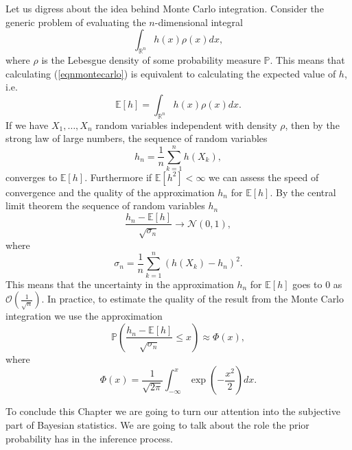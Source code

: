 \documentclass[12pt]{book}
\newcommand{\p}{\mathbb{P}}
\begin{document}
Let us digress about the idea behind Monte Carlo integration. Consider the generic problem of evaluating the $n$-dimensional
integral
\begin{equation}\label{eqnmontecarlo}
\int_{\mathbb{R}^{n}}h(x)\rho(x)dx,
\end{equation}  
where $\rho$ is the Lebesgue density of some probability measure $\p$. This means that calculating (\ref{eqnmontecarlo}) 
is equivalent to calculating the expected value of $h$, i.e.
\begin{equation*}
\mathbb{E}[h]=\int_{\mathbb{R}^{n}}h(x)\rho(x)dx.
\end{equation*}
If we have $X_{1},\ldots,X_{n}$ random variables independent with density $\rho$, then by the strong law of large numbers, the sequence of random
variables
\begin{equation*}
h_{n}=\frac{1}{n}\sum_{k=1}^{n} h(X_{k}),
\end{equation*}
converges to $\mathbb{E}[h]$\cite{dudley2002real}. Furthermore if $\mathbb{E}[h^{2}]<\infty$ we can assess the speed of
convergence and the quality of the approximation $h_{n}$ for $\mathbb{E}[h]$. By the central limit theorem
the sequence of random  variables $h_{n}$
\begin{equation*}
\frac{h_{n}-\mathbb{E}[h]}{\sqrt{\sigma_{n}}}\rightarrow \mathcal{N}(0,1),
\end{equation*}
where 
\begin{equation*}
\sigma_{n}=\frac{1}{n}\sum_{k=1}^{n}(h(X_{k})-h_{n})^{2}.
\end{equation*}
This means that the uncertainty in the approximation $h_{n}$ for $\mathbb{E}[h]$ goes to $0$ as $\mathcal{O}(\frac{1}{\sqrt{n}})$.
In practice, to estimate the quality of the result from the Monte Carlo integration we use the approximation
\begin{equation*}
\p\left(\frac{h_{n}-\mathbb{E}[h]}{\sqrt{\sigma_{n}}}\leq x\right)\approx\Phi(x),
\end{equation*}
where 
\begin{equation*}
\Phi(x)=\frac{1}{\sqrt{2\pi}}\int_{-\infty}^{x}\exp(-\frac{x^{2}}{2})dx.
\end{equation*}
\newline

To conclude this Chapter we are going to turn our attention into the subjective part of Bayesian statistics.  We are 
going to talk about  the role the  prior probability has in the inference process. 
\end{document}
